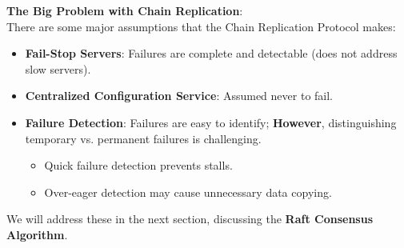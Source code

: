 \newpage 

\noindent
\textbf{The Big Problem with Chain Replication}:\\

\noindent
There are some major assumptions that the Chain Replication Protocol makes:
\begin{itemize}
    \item \textbf{Fail-Stop Servers}: Failures are complete and detectable (does not address slow servers).
    \item \textbf{Centralized Configuration Service}: Assumed never to fail.
    \item \textbf{Failure Detection}: Failures are easy to identify; \textbf{However}, distinguishing temporary vs. permanent failures is challenging.
    \begin{itemize}
        \item Quick failure detection prevents stalls.
        \item Over-eager detection may cause unnecessary data copying.
    \end{itemize}
\end{itemize}
\noindent
We will address these in the next section, discussing the \textbf{Raft Consensus Algorithm}.

